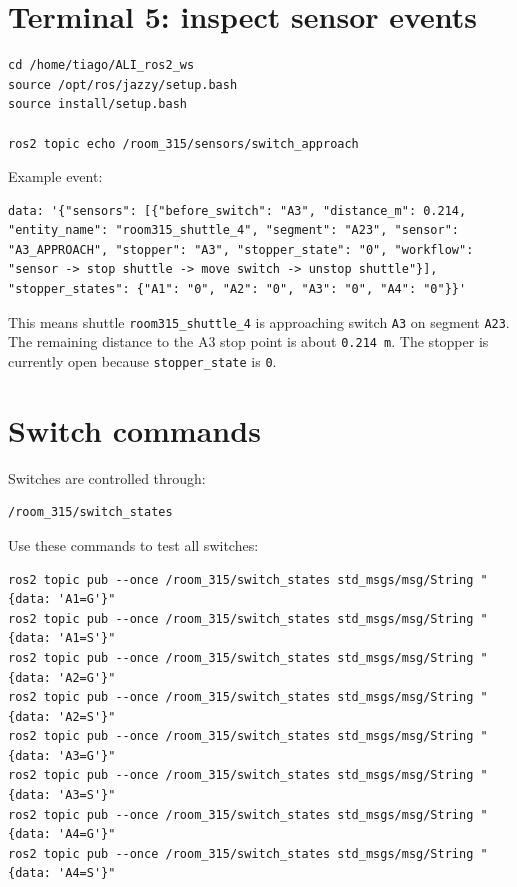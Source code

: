 \documentclass[12pt,a4paper]{report}
\begin{document}
\section{Terminal 5: inspect sensor events}

\begin{lstlisting}[style=terminalcode]
cd /home/tiago/ALI_ros2_ws
source /opt/ros/jazzy/setup.bash
source install/setup.bash

ros2 topic echo /room_315/sensors/switch_approach
\end{lstlisting}

Example event:

\begin{lstlisting}[style=terminalcode]
data: '{"sensors": [{"before_switch": "A3", "distance_m": 0.214, "entity_name": "room315_shuttle_4", "segment": "A23", "sensor": "A3_APPROACH", "stopper": "A3", "stopper_state": "0", "workflow": "sensor -> stop shuttle -> move switch -> unstop shuttle"}], "stopper_states": {"A1": "0", "A2": "0", "A3": "0", "A4": "0"}}'
\end{lstlisting}

This means shuttle \texttt{room315\_shuttle\_4} is approaching switch
\texttt{A3} on segment \texttt{A23}. The remaining distance to the A3 stop
point is about \texttt{0.214 m}. The stopper is currently open because
\texttt{stopper\_state} is \texttt{0}.

\section{Switch commands}

Switches are controlled through:

\begin{lstlisting}[style=terminalcode]
/room_315/switch_states
\end{lstlisting}

Use these commands to test all switches:

\begin{lstlisting}[style=terminalcode]
ros2 topic pub --once /room_315/switch_states std_msgs/msg/String "{data: 'A1=G'}"
ros2 topic pub --once /room_315/switch_states std_msgs/msg/String "{data: 'A1=S'}"
ros2 topic pub --once /room_315/switch_states std_msgs/msg/String "{data: 'A2=G'}"
ros2 topic pub --once /room_315/switch_states std_msgs/msg/String "{data: 'A2=S'}"
ros2 topic pub --once /room_315/switch_states std_msgs/msg/String "{data: 'A3=G'}"
ros2 topic pub --once /room_315/switch_states std_msgs/msg/String "{data: 'A3=S'}"
ros2 topic pub --once /room_315/switch_states std_msgs/msg/String "{data: 'A4=G'}"
ros2 topic pub --once /room_315/switch_states std_msgs/msg/String "{data: 'A4=S'}"
\end{lstlisting}
\end{document}
